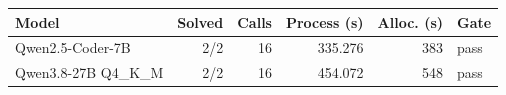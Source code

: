 \begin{tabularx}{\textwidth}{Yrrrrl}
\toprule Model & Solved & Calls & Process (s) & Alloc. (s) & Gate \\
\midrule
Qwen2.5-Coder-7B & 2/2 & 16 & 335.276 & 383 & pass \\
Qwen3.8-27B Q4\_K\_M & 2/2 & 16 & 454.072 & 548 & pass \\
\bottomrule
\end{tabularx}
